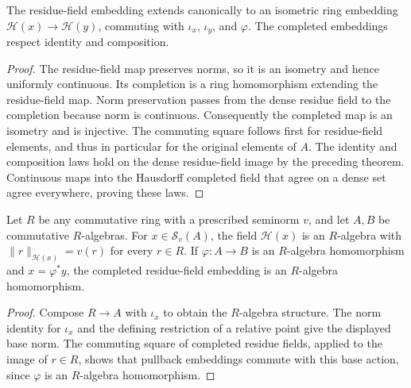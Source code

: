 \begin{theorem}
\label{spectrum:completed-residue-field-pullback}
\leanok
{}
The residue-field embedding extends canonically to an isometric ring
embedding $\mathcal H(x)\to\mathcal H(y)$, commuting with $\iota_x$,
$\iota_y$, and $\varphi$. The completed embeddings respect identity and
composition.
\end{theorem}
\begin{proof}
The residue-field map preserves norms, so it is an isometry and hence
uniformly continuous. Its completion is a ring homomorphism extending
the residue-field map. Norm preservation passes from the dense residue
field to the completion because norm is continuous. Consequently the
completed map is an isometry and is injective.
The commuting square follows first for residue-field elements, and thus
in particular for the original elements of $A$.
The identity and composition laws hold on the dense residue-field image
by the preceding theorem. Continuous maps into the Hausdorff completed
field that agree on a dense set agree everywhere, proving these laws.
\end{proof}

\begin{corollary}
\label{spectrum:relative-completed-residue-field}
\leanok
{}
Let $R$ be any commutative ring with a prescribed seminorm $v$, and let
$A,B$ be commutative $R$-algebras. For $x\in\mathcal S_v(A)$, the field
$\mathcal H(x)$ is an $R$-algebra with
$\|r\|_{\mathcal H(x)}=v(r)$ for every $r\in R$.
If $\varphi:A\to B$ is an $R$-algebra homomorphism and $x=\varphi^*y$,
the completed residue-field embedding is an $R$-algebra homomorphism.
\end{corollary}
\begin{proof}
Compose $R\to A$ with $\iota_x$ to obtain the $R$-algebra structure.
The norm identity for $\iota_x$ and the defining restriction of a relative
point give the displayed base norm. The commuting square of completed
residue fields, applied to the image of $r\in R$, shows that pullback
embeddings commute with this base action, since $\varphi$ is an
$R$-algebra homomorphism.
\end{proof}

